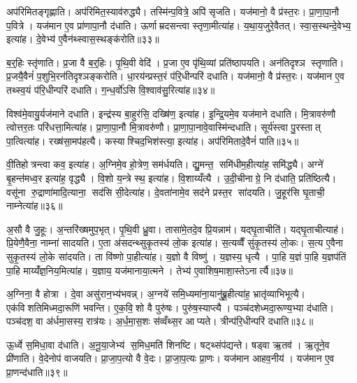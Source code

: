 अप॑रिमितङ्गृह्णाति। अप॑रिमित॒स्याव॑रुद्ध्यै। तस्मि॑न्प॒वित्रे॒ अपि॑ सृजति। यज॑मानो॒ वै प्र॑स्त॒रः। प्रा॒णा॒पा॒नौ प॒वित्रे। यज॑मान ए॒व प्रा॑णापा॒नौ द॑धाति। ऊर्णाम्रदसन्त्वा स्तृणा॒मीत्या॑ह। य॒था॒य॒जुरे॒वैतत्। स्वा॒स॒स्थन्दे॒वेभ्य॒ इत्या॑ह। दे॒वेभ्य॑ ए॒वैन॑थ्स्वास॒स्थङ्क॑रोति॥३३॥

ब॒र्॒हिः स्तृ॑णाति। प्र॒जा वै ब॒र्॒हिः। पृ॒थि॒वी वेदि॑। प्र॒जा ए॒व पृ॑थि॒व्यां प्रति॑ष्ठापयति। अन॑तिदृश्ञ स्तृणाति। प्र॒जयै॒वैनं॑ प॒शुभि॒रन॑तिदृश्ञङ्करोति। धा॒रय॑न्प्रस्त॒रं प॑रि॒धीन्परि॑ दधाति। यज॑मानो॒ वै प्र॑स्त॒रः। यज॑मान ए॒व तथ्स्व॒यं प॑रि॒धीन्परि॑ दधाति। ग॒न्ध॒र्वो॑ऽसि वि॒श्वाव॑सु॒रित्या॑ह॥३४॥

विश्व॑मे॒वायु॒र्यज॑माने दधाति। इन्द्र॑स्य बा॒हुर॑सि॒ दख्षि॑ण॒ इत्या॑ह। इ॒न्द्रि॒यमे॒व यज॑माने दधाति। मि॒त्रावरु॑णौ त्वोत्तर॒तः परि॑धत्ता॒मित्या॑ह। प्रा॒णा॒पा॒नौ मि॒त्रावरु॑णौ। प्रा॒णा॒पा॒नावे॒वास्मि॑न्दधाति। सूर्य॑स्त्वा पु॒रस्तात् पा॒त्वित्या॑ह। रख्ष॑सा॒मप॑हत्यै। कस्याश्चिद॒भिश॑स्त्या॒ इत्या॑ह। अप॑रिमितादे॒वैनं॑ पाति॥३५॥

वी॒तिहोत्रन्त्वा कव॒ इत्या॑ह। अ॒ग्निमे॒व हो॒त्रेण॒ सम॑र्धयति। द्यु॒मन्त॒ समि॑धीम॒हीत्या॑ह॒ समि॑द्ध्यै। अग्ने॑ बृ॒हन्त॑मध्व॒र इत्या॑ह॒ वृद्ध्यै। वि॒शो य॒न्त्रे स्थ॒ इत्या॑ह। वि॒शाय्यँत्यै। उ॒दी॒चीनाग्रे॒ नि द॑धाति॒ प्रति॑ष्ठित्यै। वसू॑ना रु॒द्राणा॑मादि॒त्याना॒ सद॑सि सी॒देत्या॑ह। दे॒वता॑नामे॒व सद॑ने प्रस्त॒र सा॑दयति। जु॒हूर॑सि घृ॒ताची॒ नाम्नेत्या॑ह॥३६॥

अ॒सौ वै जु॒हूः। अ॒न्तरि॑ख्षमुप॒भृत्। पृ॒थि॒वी ध्रु॒वा। तासा॑मे॒तदे॒व प्रि॒यन्नाम॑। यद्घृ॒ताचीति॑। यद्घृ॒ताचीत्याह॑। प्रि॒येणै॒वैना॒ नाम्ना॑ सादयति। ए॒ता अ॑सदन्थ्सुकृ॒तस्य॑ लो॒क इत्या॑ह। स॒त्यव्वैँ सु॑कृ॒तस्य॑ लो॒कः। स॒त्य ए॒वैना सुकृ॒तस्य॑ लो॒के सा॑दयति। ता वि॑ष्णो पा॒हीत्या॑ह। य॒ज्ञो वै विष्णु॑। य॒ज्ञस्य॒ धृत्यै। पा॒हि य॒ज्ञं पा॒हि य॒ज्ञप॑तिं पा॒हि माय्यँ॑ज्ञ॒निय॒मित्या॑ह। य॒ज्ञाय॒ यज॑मानाया॒त्मने। तेभ्य॑ ए॒वाशिष॒माशा॒स्तेऽनार्त्यै॥३७॥\anuvakamend[स्थेत्या॑ह पृथि॒वी वेदि॒र्यन्ति॑ क्रि॒यते॒ वीणु॑र्वी॒र्य॑संमितङ्करोत्याह पाति॒ नाम्नेत्या॑ह लो॒के सा॑दयति॒ षट् च॑]

अ॒ग्निना॒ वै होत्रा। दे॒वा असु॑रान॒भ्य॑भवन्न्। अ॒ग्नये॑ समि॒ध्यमा॑ना॒यानु॑ब्रू॒हीत्या॑ह॒ भ्रातृ॑व्याभिभूत्यै। एक॑विशतिमिध्मदा॒रूणि॑ भवन्ति। ए॒क॒वि॒शो वै पुरु॑षः। पुरु॑ष॒स्याप्त्यै। पञ्च॑दशेध्मदा॒रूण्य॒भ्या द॑धाति। पञ्च॑दश॒ वा अ॑र्धमा॒सस्य॒ रात्र॑यः। अ॒र्ध॒मा॒स॒शः स॑व्वँथ्स॒र आप्यते। त्रीन्प॑रि॒धीन्परि॑ दधाति॥३८॥

ऊ॒र्ध्वे स॒मिधा॒वा द॑धाति। अ॒नू॒या॒जेभ्य॑ स॒मिध॒मति॑ शिनष्टि। षट्थ्संप॑द्यन्ते। षड्वा ऋ॒तव॑। ऋ॒तूने॒व प्री॑णाति। वे॒देनोप॑ वाजयति। प्रा॒जा॒प॒त्यो वै वे॒दः। प्रा॒जा॒प॒त्यः प्रा॒णः। यज॑मान आहव॒नीय॑। यज॑मान ए॒व प्रा॒णन्द॑धाति॥३९॥

